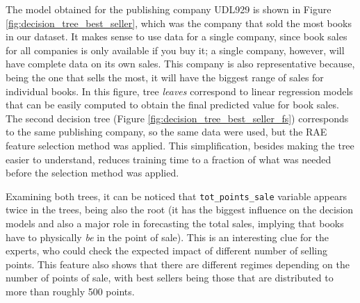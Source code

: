 \documentclass[a4paper,10pt,twocolumn,preprint,3p]{elsarticle}
\begin{document}
The model obtained for the publishing company UDL929 is shown in
Figure \ref{fig:decision_tree_best_seller}, which was the company that
sold the most books in our dataset. It makes sense to use data for a
single company, since book sales for all companies is only available
if you buy it; a single company, however, will have complete data on
its own sales. This company is also representative because, being the
one that sells the most, it will have the biggest range of sales for
individual books. In this figure, tree {\em leaves} correspond to
linear regression models that can be easily computed to obtain the
final predicted value for book sales.
The second decision tree (Figure
\ref{fig:decision_tree_best_seller_fs}) corresponds to the same
publishing company, so the same data were used, but the RAE %
feature
selection method was applied. This simplification, besides making the
tree easier to understand, reduces training time to a fraction of what
was needed before the selection method was applied. 

Examining both trees, it can be noticed that
\texttt{tot\_points\_sale} variable appears twice in the trees, being also the root
(it has the biggest influence on the decision models and also a major role in forecasting the total sales, implying that books have to physically {\em be} in the point of sale).
This is an interesting clue for the
experts, who could check the expected impact of different number of
selling points. This feature also shows that there are different
regimes depending on the number of points of sale, with best sellers
being those that are distributed to more than roughly 500 points. 
\end{document}
